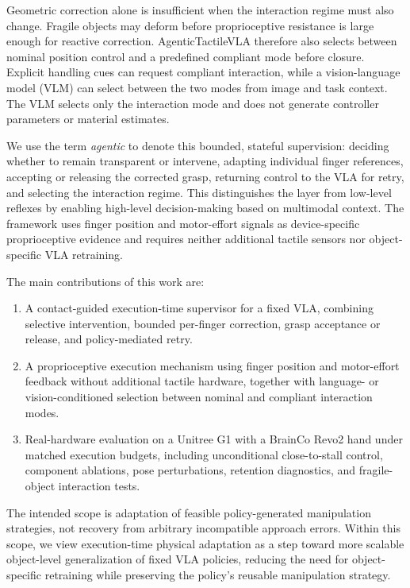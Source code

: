 \documentclass[letterpaper,10pt,conference]{ieeeconf}
\begin{document}
Geometric correction alone is insufficient when the interaction regime must
also change. Fragile objects may deform before proprioceptive resistance is
large enough for reactive correction. AgenticTactileVLA therefore also selects
between nominal position control and a predefined compliant mode before
closure. Explicit handling cues can request compliant interaction, while a
vision-language model (VLM) can select between the two modes from image and
task context. The VLM selects only the interaction mode and does not generate
controller parameters or material estimates.

We use the term \emph{agentic} to denote this bounded, stateful supervision:
deciding whether to remain transparent or intervene, adapting individual
finger references, accepting or releasing the corrected grasp, returning
control to the VLA for retry, and selecting the interaction regime. This distinguishes the layer from low-level reflexes by enabling high-level decision-making based on multimodal context. The
framework uses finger position and motor-effort signals as device-specific
proprioceptive evidence and requires neither additional tactile sensors nor
object-specific VLA retraining.

The main contributions of this work are:
\begin{enumerate}

\item A contact-guided execution-time supervisor for a fixed VLA, combining
selective intervention, bounded per-finger correction, grasp acceptance or
release, and policy-mediated retry.

\item A proprioceptive execution mechanism using finger position and
motor-effort feedback without additional tactile hardware, together with
language- or vision-conditioned selection between nominal and compliant
interaction modes.

\item Real-hardware evaluation on a Unitree G1 with a BrainCo Revo2 hand under
matched execution budgets, including unconditional close-to-stall control,
component ablations, pose perturbations, retention diagnostics, and
fragile-object interaction tests.

\end{enumerate}

The intended scope is adaptation of feasible policy-generated manipulation
strategies, not recovery from arbitrary incompatible approach errors.
Within this scope, we view execution-time physical adaptation as a step toward
more scalable object-level generalization of fixed VLA policies, reducing the
need for object-specific retraining while preserving the policy's reusable
manipulation strategy.
\end{document}

